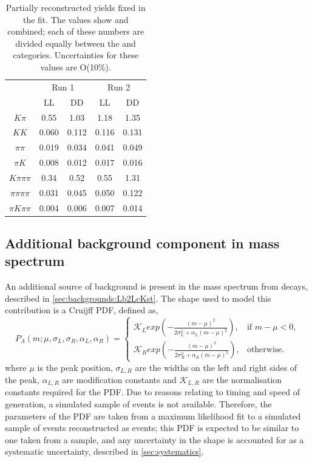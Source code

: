 \begin{table}[h]
\centering
\begin{tabular}{c|cc|cc}
\hline
& \multicolumn{2}{c}{Run 1} & \multicolumn{2}{c}{Run 2} \\
& LL & DD & LL & DD \\
\hline
$K\pi$ & 0.55 & 1.03 & 1.18 & 1.35 \\
$KK$ & 0.060 & 0.112 & 0.116 & 0.131 \\
$\pi\pi$ & 0.019 & 0.034 & 0.041 & 0.049 \\
$\pi K$ & 0.008 & 0.012 & 0.017 & 0.016 \\
$K\pi\pi\pi$ & 0.34 & 0.52 & 0.55 & 1.31 \\
$\pi\pi\pi\pi$ & 0.031 & 0.045 & 0.050 & 0.122  \\
$\pi K\pi\pi$ & 0.004 & 0.006 & 0.007 & 0.014 \\
\hline
\end{tabular}
\caption{Partially reconstructed yields fixed in the \CP fit. The values show \Bp and \Bm combined; each of these numbers are divided equally between the \Bp and \Bm categories. Uncertainties for these values are O(10\%).}
\label{partrecofixedyields}
\end{table}

\subsection{Additional background component in \kk mass spectrum}
\label{sec:cpfit:Lb2LcKst}

An additional source of background is present in the \kk mass spectrum from  decays, described in \sect\ref{sec:backgrounds:Lb2LcKst}. The shape used to model this \decay{\Lb}{\Lc\Kstarm} contribution is a Cruijff PDF, defined as,
\begin{equation}
  P_{\Lambda}(m; \mu,\sigma_L,\sigma_R,\alpha_L,\alpha_R)=
\begin{cases}
    \mathcal{K}_{L} exp \left( -\frac{(m-\mu)^2}{2\sigma_L^2 + \alpha_L(m-\mu)^2} \right) ,     & \text{if } m-\mu < 0, \\
    \mathcal{K}_{R} exp \left( -\frac{(m-\mu)^2}{2\sigma_R^2 + \alpha_R(m-\mu)^2} \right) ,     & \text{otherwise.}
\end{cases}
\label{Cruijff}
\end{equation}%
where $\mu$ is the peak position, $\sigma_{L,R}$ are the widths on the left and right sides of the peak, $\alpha_{L,R}$ are modification constants and $\mathcal{K}_{L,R}$ are the normalisation constants required for the PDF. Due to reasons relating to timing and speed of generation, a simulated sample of \decay{\Lb}{\Lc\Kstarm} events is not available. Therefore, the parameters of the PDF are taken from a maximum likelihood fit to a simulated sample of \decay{\Lb}{\Lc\Km} events reconstructed as \decay{\Bm}{\D\Km} events; this PDF is expected to be similar to one taken from a \decay{\Lb}{\Lc\Kstarm} sample, and any uncertainty in the shape is accounted for as a systematic uncertainty, described in \sect\ref{sec:systematics}.

